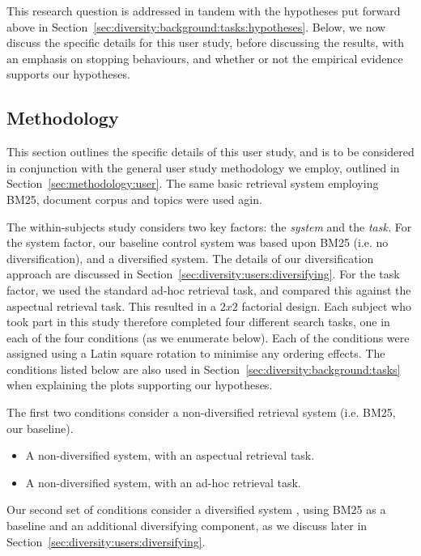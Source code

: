 This research question is addressed in tandem with the hypotheses put forward above in Section~\ref{sec:diversity:background:tasks:hypotheses}. Below, we now discuss the specific details for this user study, before discussing the results, with an emphasis on stopping behaviours, and whether or not the empirical evidence supports our hypotheses.

\subsection{Methodology}\label{sec:diversity:users:method}
This section outlines the specific details of this user study, and is to be considered in conjunction with the general user study methodology we employ, outlined in Section~\ref{sec:methodology:user}. The same basic retrieval system employing BM25, document corpus and topics were used agin.

The within-subjects study considers two key factors: the \emph{system} and the \emph{task.} For the system factor, our baseline control system was based upon BM25 (i.e. no diversification), and a diversified system. The details of our diversification approach are discussed in Section~\ref{sec:diversity:users:diversifying}. For the task factor, we used the standard ad-hoc retrieval task, and compared this against the aspectual retrieval task. This resulted in a $2x2$ factorial design. Each subject who took part in this study therefore completed four different search tasks, one in each of the four conditions (as we enumerate below). Each of the conditions were assigned using a Latin square rotation to minimise any ordering effects. The conditions listed below are also used in Section~\ref{sec:diversity:background:tasks} when explaining the plots supporting our hypotheses.

The first two conditions consider a non-diversified retrieval system  (i.e. BM25, our baseline).

\begin{itemize}
    \item{ A non-diversified system, with an aspectual retrieval task.}
    \item{ A non-diversified system, with an ad-hoc retrieval task.}
\end{itemize}

Our second set of conditions consider a diversified system , using BM25 as a baseline and an additional diversifying component, as we discuss later in Section~\ref{sec:diversity:users:diversifying}.

